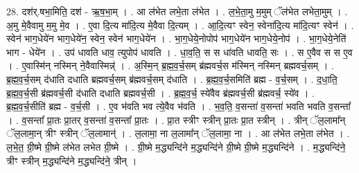 \documentclass[17pt]{extarticle}
\begin{document}
28. दश॑र्.षभा॒मिति॒ दश॑ - ऋ॒ष॒भा॒म् । . आ ल॑भेत लभे॒ता ल॑भेत । . ल॒भे॒ता॒मु म॒मुम् ॅल॑भेत लभेता॒मुम् । . अ॒मु मे॒वैवामु म॒मु मे॒व । . ए॒वा दि॒त्य मा॑दि॒त्य मे॒वैवा दि॒त्यम् । . आ॒दि॒त्यꣳ स्वेन॒ स्वेना॑दि॒त्य मा॑दि॒त्यꣳ स्वेन॑ । . स्वेन॑ भाग॒धेये॑न भाग॒धेये॑न॒ स्वेन॒ स्वेन॑ भाग॒धेये॑न । . भा॒ग॒धेये॒नोपोप॑ भाग॒धेये॑न भाग॒धेये॒नोप॑ । . भा॒ग॒धेये॒नेति॑ भाग - धेये॑न । . उप॑ धावति धाव॒ त्युपोप॑ धावति । . धा॒व॒ति॒ स स धा॑वति धावति॒ सः । . स ए॒वैव स स ए॒व । . ए॒वास्मि॑न् नस्मिन् ने॒वैवास्मिन्न्॑ । . अ॒स्मि॒न् ब्र॒ह्म॒व॒र्च॒सम् ब्र॑ह्मवर्च॒स म॑स्मिन् नस्मिन् ब्रह्मवर्च॒सम् । . ब्र॒ह्म॒व॒र्च॒सम् द॑धाति दधाति ब्रह्मवर्च॒सम् ब्र॑ह्मवर्च॒सम् द॑धाति । . ब्र॒ह्म॒व॒र्च॒समिति॑ ब्रह्म - व॒र्च॒सम् । . द॒धा॒ति॒ ब्र॒ह्म॒व॒र्च॒सी ब्र॑ह्मवर्च॒सी द॑धाति दधाति ब्रह्मवर्च॒सी । . ब्र॒ह्म॒व॒र्च॒ स्ये॑वैव ब्र॑ह्मवर्च॒सी ब्र॑ह्मवर्च॒ स्ये॑व । . ब्र॒ह्म॒व॒र्च॒सीति॑ ब्रह्म - व॒र्च॒सी । . ए॒व भ॑वति भव त्ये॒वैव भ॑वति । . भ॒व॒ति॒ व॒सन्ता॑ व॒सन्ता॑ भवति भवति व॒सन्ता᳚ । . व॒सन्ता᳚ प्रा॒तः प्रा॒तर् व॒सन्ता॑ व॒सन्ता᳚ प्रा॒तः । . प्रा॒त स्त्रीꣳ स्त्रीन् प्रा॒तः प्रा॒त स्त्रीन् । . त्रीन् ॅल॒लामा᳚न् ॅल॒लामा॒न् त्रीꣳ स्त्रीन् ॅल॒लामान्॑ । . ल॒लामा॒ ना ल॒लामा᳚न् ॅल॒लामा॒ ना । . आ ल॑भेत लभे॒ता ल॑भेत । . ल॒भे॒त॒ ग्री॒ष्मे ग्री॒ष्मे ल॑भेत लभेत ग्री॒ष्मे । . ग्री॒ष्मे म॒द्ध्यन्दि॑ने म॒द्ध्यन्दि॑ने ग्री॒ष्मे ग्री॒ष्मे म॒द्ध्यन्दि॑ने । . म॒द्ध्यन्दि॑ने॒ त्रीꣳ स्त्रीन् म॒द्ध्यन्दि॑ने म॒द्ध्यन्दि॑ने॒ त्रीन् । \newline
\end{document}
